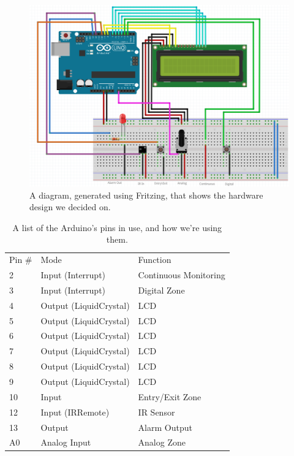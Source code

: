 \documentclass[a4paper,11pt]{article}
\theoremstyle{mytheor}
\begin{document}
\begin{figure}[h]
\caption{A diagram, generated using Fritzing, that shows the hardware design we decided on.}
\centering
\includegraphics[width=\textwidth]{design}
\end{figure}

\begin{table}[h]
\centering
\caption{A list of the Arduino's pins in use, and how we're using them.}
\label{Pins}
\begin{tabular}{lll}
Pin \# & Mode                   & Function              \\
2      & Input (Interrupt)      & Continuous Monitoring \\
3      & Input (Interrupt)      & Digital Zone          \\
4      & Output (LiquidCrystal) & LCD                   \\
5      & Output (LiquidCrystal) & LCD                   \\
6      & Output (LiquidCrystal) & LCD                   \\
7      & Output (LiquidCrystal) & LCD                   \\
8      & Output (LiquidCrystal) & LCD                   \\
9      & Output (LiquidCrystal) & LCD                   \\
10     & Input                  & Entry/Exit Zone       \\
12     & Input (IRRemote)       & IR Sensor             \\
13     & Output                 & Alarm Output          \\
A0     & Analog Input           & Analog Zone          
\end{tabular}
\end{table}
\end{document}
